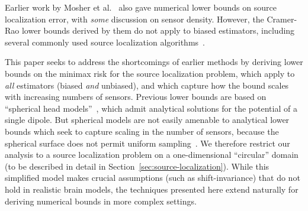 \documentclass[conference,letterpaper]{IEEEtran}
\begin{document}

Earlier work by Mosher et al.~\cite{Mosher1993Error} also gave numerical lower
bounds on source localization error, with \emph{some} discussion on sensor
density. However, the Cramer-Rao lower bounds derived by them do not apply to
biased estimators, including several commonly used source localization
algorithms~\cite{Hamalainen1994Interpreting,Lin2006Assessing}.

This paper seeks to address the shortcomings of earlier methods by deriving
lower bounds on the minimax risk for the source localization problem, which
apply to \emph{all} estimators (biased \emph{and} unbiased), and which capture
how the bound scales with increasing numbers of sensors. Previous lower bounds
are based on ``spherical head
models''~\cite{Nunez2006Electric,Grover2016Information}, which admit analytical
solutions for the potential of a single dipole. But spherical models are not
easily amenable to analytical lower bounds which seek to capture scaling in the
number of sensors, because the spherical surface does not permit uniform
sampling~\cite{Heath1956Thirteen}. We therefore restrict our analysis to a
source localization problem on a one-dimensional ``circular'' domain (to be
described in detail in Section~\ref{sec:source-localization}). While this
simplified model makes crucial assumptions (such as shift-invariance) that do
not hold in realistic brain models, the techniques presented here extend
naturally for deriving numerical bounds in more complex settings.
\end{document}
